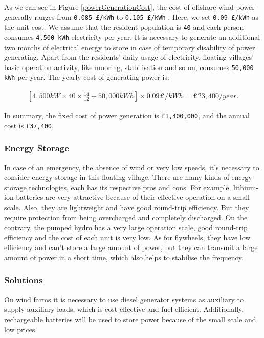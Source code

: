 \documentclass[11pt]{article}
\numberwithin{equation}{section}
\begin{document}
As we can see in Figure \ref{powerGenerationCost}, the cost of offshore wind power generally ranges from \texttt{0.085 £/kWh} to \texttt{0.105 £/kWh} \cite{10.1016/j.ijepes.2021.107273}. Here, we set \texttt{0.09 £/kWh} as the unit cost. We assume that the resident population is \texttt{40} and each person consumes \texttt{4,500 kWh} electricity per year. It is necessary to generate an additional two months of electrical energy to store in case of temporary disability of power generating. Apart from the residents’ daily usage of electricity, floating villages’ basic operation activity, like mooring, stabilisation and so on, consumes \texttt{50,000 kWh} per year.   The yearly cost of generating power is:

\begin{align}
\label{eqEnergyCost}
\left[4,500kW\times 40\times \frac{14}{12}+ 50,000kWh\right]\times 0.09 \pounds /kWh = \pounds23,400/year.
\end{align}

In summary, the fixed cost of power generation  is \texttt{£1,400,000}, and the annual cost is \texttt{£37,400}.

\subsubsection{Energy Storage}
\label{sec:orge3feff1}
In case of an emergency, the absence of wind or very low speeds, it’s necessary to consider energy storage in this floating village. There are many kinds of energy storage technologies, each has its respective pros and cons. For example, lithium-ion batteries are very attractive because of their effective operation on a small scale. Also, they are lightweight and have good round-trip efficiency. But they require protection from being overcharged and completely discharged. On the contrary, the pumped hydro has a very large operation scale, good round-trip efficiency and the cost of each unit is very low. As for flywheels, they have low efficiency and can’t store a large amount of power, but they can transmit a large amount of power in a short time, which also helps to stabilise the frequency.

\subsubsection{Solutions}
\label{sec:orgd291b10}
On wind farms it is necessary to use diesel generator systems as auxiliary to supply auxiliary loads, which is cost effective and fuel efficient. Additionally, rechargeable batteries will be used to store power because of the small scale and low prices.
\end{document}
